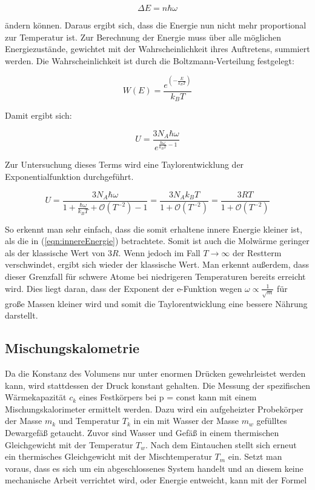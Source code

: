 \begin{equation*}
\Delta E = n \hbar \omega
\end{equation*}

ändern können. Daraus ergibt sich, dass die Energie nun
nicht mehr proportional zur Temperatur ist.
Zur Berechnung der Energie muss über alle möglichen 
Energiezustände, gewichtet mit der Wahrscheinlichkeit
ihres Auftretens, summiert werden. Die Wahrscheinlichkeit
ist durch die Boltzmann-Verteilung festgelegt: 

\begin{equation*}
W(E) = \frac{e^{\left(-\frac{E}{k_B T}\right)}}{k_B T}
\end{equation*}

Damit ergibt sich:

\begin{equation*}
U = \frac{3 N_A \hbar \omega}{e^{\frac{\hbar \omega}{k_B T} - 1}}
\end{equation*}

Zur Untersuchung dieses Terms wird eine Taylorentwicklung
der Exponentialfunktion durchgeführt. 

\begin{equation*}
U = \frac{3 N_A \hbar \omega}{1 + \frac{\hbar\omega}{k_B T} + \mathcal{O}(T^{-2})-1}
= \frac{3 N_A k_B T}{1 + \mathcal{O} (T^{-2})}
= \frac{3 R T}{1 + \mathcal{O} (T^{-2})}
\end{equation*}

So erkennt man sehr einfach, dass die somit erhaltene innere
Energie kleiner ist, als die in (\ref{eqn:innereEnergie}) 
betrachtete. Somit ist auch die Molwärme geringer als der
klassische Wert von $3 R$. Wenn jedoch im Fall $T \rightarrow \infty$
der Restterm verschwindet, ergibt sich wieder der klassische
Wert.
Man erkennt außerdem, dass dieser Grenzfall für schwere Atome
bei niedrigeren Temperaturen bereits erreicht wird. Dies 
liegt daran, dass der Exponent der e-Funktion wegen 
$\omega \propto \frac{1}{\sqrt{m}}$ für große Massen kleiner
wird und somit die Taylorentwicklung eine bessere Nährung 
darstellt.

\subsection{Mischungskalometrie}

Da die Konstanz des Volumens nur unter enormen Drücken 
gewehrleistet werden kann, wird stattdessen der Druck 
konstant gehalten. 
Die Messung der spezifischen Wärmekapazität $c_k$ eines 
Festkörpers bei p = const kann mit einem Mischungskalorimeter
ermittelt werden.
Dazu wird ein aufgeheizter Probekörper der Masse $m_k$ und 
Temperatur $T_k$ in ein mit Wasser der Masse $m_w$ gefülltes 
Dewargefäß getaucht. Zuvor sind Wasser und Gefäß in einem
thermischen Gleichgewicht mit der Temperatur $T_w$. 
Nach dem Eintauchen stellt sich erneut ein thermisches 
Gleichgewicht mit der Mischtemperatur $T_m$ ein. 
Setzt man voraus, dass es sich um ein abgeschlossenes 
System handelt und an diesem keine mechanische Arbeit 
verrichtet wird, oder Energie entweicht, kann mit der 
Formel 

